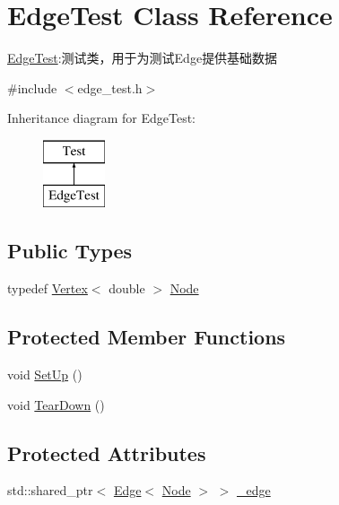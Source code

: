 \hypertarget{class_edge_test}{}\section{Edge\+Test Class Reference}
\label{class_edge_test}


\hyperlink{class_edge_test}{Edge\+Test}\+:测试类，用于为测试{\ttfamily Edge}提供基础数据  




{\ttfamily \#include $<$edge\+\_\+test.\+h$>$}

Inheritance diagram for Edge\+Test\+:\begin{figure}[H]
\begin{center}
\leavevmode
\includegraphics[height=2.000000cm]{class_edge_test}
\end{center}
\end{figure}
\subsection*{Public Types}
\begin{DoxyCompactItemize}
\item 
typedef \hyperlink{struct_introduction_to_algorithm_1_1_graph_algorithm_1_1_vertex}{Vertex}$<$ double $>$ \hyperlink{class_edge_test_a983bfc4e56ab07fc54c55f71815d39e6}{Node}
\end{DoxyCompactItemize}
\subsection*{Protected Member Functions}
\begin{DoxyCompactItemize}
\item 
void \hyperlink{class_edge_test_af1f1a79b9cc810c2548e1d2d0071f1bc}{Set\+Up} ()
\item 
void \hyperlink{class_edge_test_a14e4e78eddefbfedeebeb075fa74cbad}{Tear\+Down} ()
\end{DoxyCompactItemize}
\subsection*{Protected Attributes}
\begin{DoxyCompactItemize}
\item 
std\+::shared\+\_\+ptr$<$ \hyperlink{struct_introduction_to_algorithm_1_1_graph_algorithm_1_1_edge}{Edge}$<$ \hyperlink{class_edge_test_a983bfc4e56ab07fc54c55f71815d39e6}{Node} $>$ $>$ \hyperlink{class_edge_test_a8ab903577f2907ee1110d5f5f4d16b83}{\+\_\+edge}
\end{DoxyCompactItemize}


